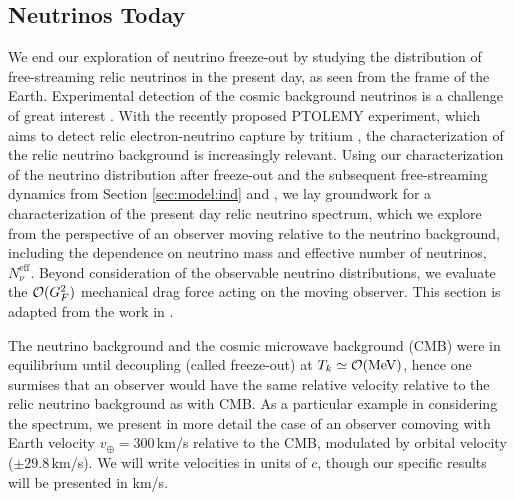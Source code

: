 \subsection{Neutrinos Today}\label{ch:nu:today}
We end our exploration of neutrino freeze-out by studying the distribution of free-streaming relic neutrinos in the present day, as seen from the frame of the Earth. Experimental detection of the cosmic background neutrinos is a challenge of great interest \cite{Stodolsky:1974aq,Cabibbo:1982bb,Shvartsman,Langacker:1982ih,Smith:1983jj,Ferreras:1995wf,Hagmann:1999kf,Duda:2001hd,Gelmini:2004hg,Ringwald:2009bg,Liao:2012wb,Hedman:2013hha}. With the  recently proposed PTOLEMY experiment, which aims to detect relic  electron-neutrino capture by tritium \cite{Betts:2013uya}, the characterization of the relic neutrino background is increasingly relevant.  Using our  characterization of the neutrino distribution after freeze-out and the subsequent free-streaming dynamics from Section  \ref{sec:model:ind} and \cite{Birrell:2012gg}, we lay groundwork for a characterization of the present day relic neutrino spectrum, which we explore  from the  perspective of an observer moving relative to the neutrino background, including the dependence on neutrino mass and effective number of neutrinos, $N_\nu^{\mathrm{eff}}$. Beyond consideration of the observable neutrino distributions, we evaluate the ${\cal O}(G_F^2)$ mechanical drag force acting on the moving observer. This section is adapted from the work in \cite{Birrell:2014qna}.

The neutrino background and the cosmic microwave background (CMB) were in equilibrium until decoupling (called freeze-out) at $T_k\simeq {\cal O}{\rm (MeV)}$, hence one surmises that an observer would have the same relative velocity relative to the relic neutrino background  as with CMB. As a particular example in considering the spectrum, we present in more detail the case of an observer comoving with  Earth velocity $v_\oplus=300$\,km/s relative to the CMB,  modulated by orbital velocity ($\pm29.8$\,km/s).  We will write velocities in units of $c$, though our specific results will be presented in km/s.

